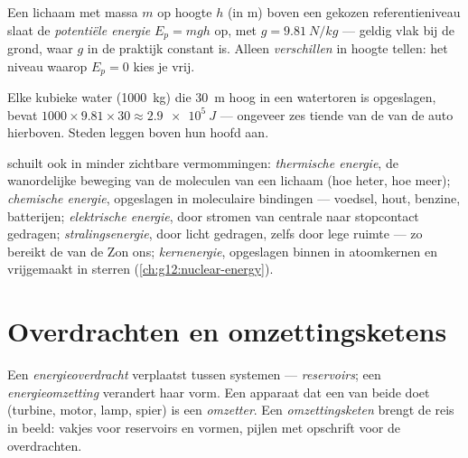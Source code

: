 \begin{definition}\label{def:g10:energy-conservation:potential}
Een lichaam met massa $m$ op hoogte $h$ (in \unit{m}) boven een gekozen
referentieniveau slaat de \emph{potentiële energie} $E_p = m g h$ op, met $g = \qty{9.81}{N/kg}$ --- geldig vlak bij
de grond, waar $g$ in de praktijk constant is. Alleen
\emph{verschillen} in hoogte tellen: het niveau waarop $E_p = 0$ kies je
vrij.
\end{definition}

\begin{example}[Watertoren]\label{ex:g10:energy-conservation:potential}
Elke kubieke  water (\qty{1000}{kg}) die \qty{30}{m} hoog in een
watertoren is opgeslagen, bevat
$1000 \times 9.81 \times 30 \approx \qty{2.9e5}{J}$ --- ongeveer zes
tiende van de  van de auto hierboven. Steden leggen
 boven hun hoofd aan.
\end{example}

\begin{definition}\label{def:g10:energy-conservation:forms}
 schuilt ook in minder zichtbare vermommingen: \emph{thermische
energie}, de wanordelijke beweging van de
moleculen van een lichaam (hoe heter, hoe meer); \emph{chemische
energie}, opgeslagen in moleculaire bindingen
--- voedsel, hout, benzine, batterijen; \emph{elektrische
energie}, door stromen van centrale naar
stopcontact gedragen; \emph{stralingsenergie},
door licht gedragen, zelfs door lege ruimte --- zo bereikt de  van
de Zon ons; \emph{kernenergie}, opgeslagen binnen in
atoomkernen en vrijgemaakt in sterren
(\cref{ch:g12:nuclear-energy}).
\end{definition}

\section{Overdrachten en omzettingsketens}

\begin{definition}\label{def:g10:energy-conservation:transfer}
Een \emph{energieoverdracht} verplaatst 
tussen systemen --- \emph{reservoirs}; een
\emph{energieomzetting} verandert haar vorm. Een
apparaat dat een van beide doet (turbine, motor, lamp, spier) is een
\emph{omzetter}. Een
\emph{omzettingsketen} brengt de reis in beeld:
vakjes voor reservoirs en vormen, pijlen met opschrift voor de
overdrachten.
\end{definition}

